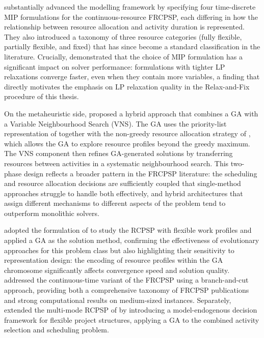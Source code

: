 \cite{Naber2014} substantially advanced the modelling framework by specifying four
time-discrete MIP formulations for the continuous-resource FRCPSP, each differing in
how the relationship between resource allocation and activity duration is represented.
They also introduced a taxonomy of three resource categories (fully flexible, partially
flexible, and fixed) that has since become a standard classification in the literature.
Crucially, \cite{Naber2014} demonstrated that the choice of MIP formulation has a
significant impact on solver performance: formulations with tighter LP relaxations
converge faster, even when they contain more variables, a finding that directly
motivates the emphasis on LP relaxation quality in the Relax-and-Fix procedure of
this thesis.

On the metaheuristic side, \cite{Tritschler2017} proposed a hybrid approach that
combines a GA with a Variable Neighbourhood Search (VNS). The GA uses the
priority-list representation of \cite{Hartmann1998} together with the non-greedy
resource allocation strategy of \cite{Fundeling2010}, which allows the GA to explore
resource profiles beyond the greedy maximum. The VNS component then refines
GA-generated solutions by transferring resources between activities in a systematic
neighbourhood search. This two-phase design reflects a broader pattern in the FRCPSP
literature: the scheduling and resource allocation decisions are sufficiently coupled
that single-method approaches struggle to handle both effectively, and hybrid
architectures that assign different mechanisms to different aspects of the problem tend
to outperform monolithic solvers.

\cite{Ranjbar2010} adopted the formulation of \cite{Kolisch2006b} to study the RCPSP
with flexible work profiles and applied a GA as the solution method, confirming the
effectiveness of evolutionary approaches for this problem class but also highlighting
their sensitivity to representation design: the encoding of resource profiles within
the GA chromosome significantly affects convergence speed and solution quality.
\cite{Naber2017} addressed the continuous-time variant of the FRCPSP using a
branch-and-cut approach, providing both a comprehensive taxonomy of FRCPSP publications
and strong computational results on medium-sized instances. Separately,
\cite{Kellenbrink2015} extended the multi-mode RCPSP of \cite{Talbot1982} by
introducing a model-endogenous decision framework for flexible project structures,
applying a GA to the combined activity selection and scheduling problem.

